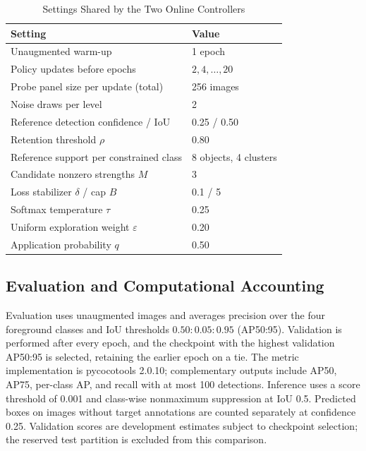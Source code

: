 \documentclass[conference]{IEEEtran}
\begin{document}
\begin{table}[t]
\caption{Settings Shared by the Two Online Controllers}
\label{tab:controller_settings}
\centering
\small
\setlength{\tabcolsep}{4pt}
\renewcommand{\arraystretch}{1.12}
\begin{tabularx}{\columnwidth}{@{}Yl@{}}
\toprule
\textbf{Setting} & \textbf{Value} \\
\midrule
Unaugmented warm-up & 1 epoch \\
Policy updates before epochs & $2,4,\ldots,20$ \\
Probe panel size per update (total) & 256 images \\
Noise draws per level & 2 \\
Reference detection confidence / IoU & 0.25 / 0.50 \\
Retention threshold $\rho$ & 0.80 \\
Reference support per constrained class & 8 objects, 4 clusters \\
Candidate nonzero strengths $M$ & 3 \\
Loss stabilizer $\delta$ / cap $B$ & 0.1 / 5 \\
Softmax temperature $\tau$ & 0.25 \\
Uniform exploration weight $\varepsilon$ & 0.20 \\
Application probability $q$ & 0.50 \\
\bottomrule
\end{tabularx}
\end{table}

\subsection{Evaluation and Computational Accounting}
\label{sec:setup_evaluation}
Evaluation uses unaugmented images and averages precision over the four foreground classes and IoU thresholds $0.50{:}0.05{:}0.95$ (AP50:95). Validation is performed after every epoch, and the checkpoint with the highest validation AP50:95 is selected, retaining the earlier epoch on a tie. The metric implementation is pycocotools 2.0.10; complementary outputs include AP50, AP75, per-class AP, and recall with at most 100 detections. Inference uses a score threshold of 0.001 and class-wise nonmaximum suppression at IoU 0.5. Predicted boxes on images without target annotations are counted separately at confidence 0.25. Validation scores are development estimates subject to checkpoint selection; the reserved test partition is excluded from this comparison.
\end{document}

